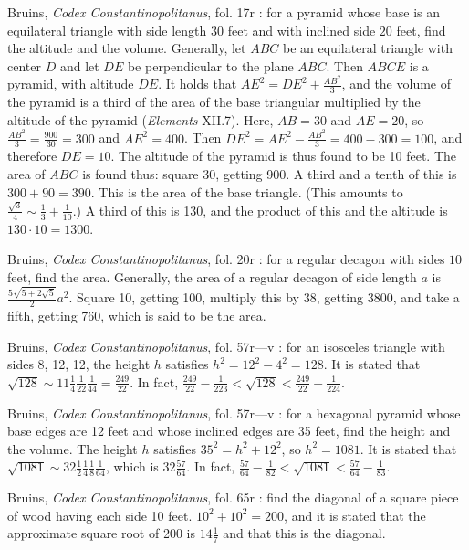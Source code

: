 \documentclass{amsart}
\theoremstyle{definition}
\begin{document}
Bruins, {\em Codex Constantinopolitanus}, fol. 17r \cite[p.~42]{constantinopolitanus}:
for a pyramid whose base is an equilateral triangle with side length $30$ feet and 
with inclined side $20$ feet, find the altitude and the volume. 
Generally, 
let $ABC$ be an equilateral triangle with center $D$ and let
$DE$ be perpendicular to the plane $ABC$. Then $ABCE$ is a pyramid, with altitude 
$DE$. It holds that $AE^2 = DE^2 + \frac{AB^2}{3}$, and the volume of
the pyramid is a third of the area of the base triangular multiplied by the
altitude of the pyramid ({\em Elements} XII.7).
Here, $AB=30$ and $AE=20$, so $\frac{AB^2}{3}=\frac{900}{30}=300$ and
$AE^2 = 400$. Then $DE^2 = AE^2 - \frac{AB^2}{3} = 400-300=100$, and therefore
$DE=10$. The altitude of the pyramid is thus found to be 10 feet. 
The area of $ABC$ is found thus: square 30, getting 900. A third and a tenth of this is
$300+90=390$. This is the area of the base triangle. (This amounts to
$\frac{\sqrt{3}}{4} \sim \frac{1}{3}+\frac{1}{10}$.)
A third of this is 130, and the product of this and the altitude is $130 \cdot 10=1300$. 

Bruins, {\em Codex Constantinopolitanus}, fol. 20r \cite[p.~58]{constantinopolitanus}:
for a regular decagon with sides $10$ feet, find the area. 
Generally, the area of a regular decagon of side length $a$ is 
$\frac{5 \sqrt{5+2\sqrt{5}}}{2}a^2$. 
Square 10, getting 100,  multiply this by 38, getting 3800, and take a fifth, getting 
760, which is said to be the area.

Bruins, {\em Codex Constantinopolitanus}, fol. 57r---v \cite[p.~160]{constantinopolitanus}:
for an isosceles triangle with sides $8$, 12, 12, the height $h$ satisfies $h^2=12^2-4^2=128$.
It is stated that $\sqrt{128} \sim 11 \frac{1}{4} \frac{1}{22} \frac{1}{44} = \frac{249}{22}$. In fact,
$\frac{249}{22} - \frac{1}{223} < \sqrt{128} <  \frac{249}{22} - \frac{1}{224}$. 

Bruins, {\em Codex Constantinopolitanus}, fol. 57r---v \cite[p.~165]{constantinopolitanus}:
for a hexagonal pyramid whose base edges are 12 feet and whose inclined edges are 35 feet,
find the height and the volume. The height $h$ satisfies $35^2 = h^2+12^2$, so
$h^2=1081$. It is stated that $\sqrt{1081} \sim 32 \frac{1}{2} \frac{1}{4} \frac{1}{8} \frac{1}{64}$, which is $32 \frac{57}{64}$. 
In fact,
$\frac{57}{64}-\frac{1}{82}<\sqrt{1081}<\frac{57}{64}-\frac{1}{83}$. 

Bruins, {\em Codex Constantinopolitanus}, fol. 65r \cite[p.~178]{constantinopolitanus}:
find the diagonal of a square piece of wood having each side 10 feet. $10^2+10^2=200$, and it is stated that the approximate
square root of 200 is $14 \frac{1}{7}$ and that this is the diagonal.
\end{document}
